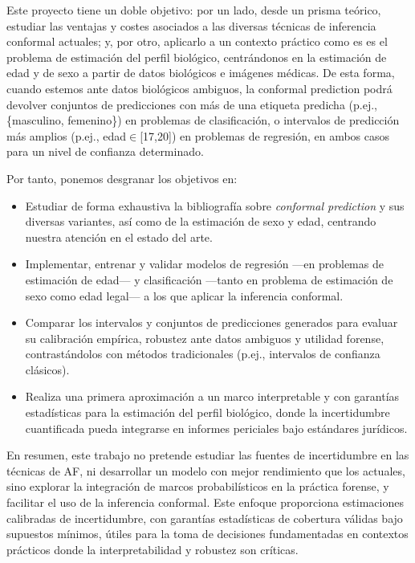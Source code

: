 
Este proyecto tiene un doble objetivo: por un lado, desde un prisma teórico, estudiar las ventajas y costes asociados a 
las diversas técnicas de inferencia conformal actuales; y, por otro, aplicarlo a un contexto práctico como es es el 
problema de estimación del perfil biológico, centrándonos en la estimación de edad y de sexo a partir de datos biológicos
e imágenes médicas. De esta forma, cuando estemos ante datos biológicos ambiguos, la conformal prediction podrá devolver 
conjuntos de predicciones con más de una etiqueta predicha (p.ej., \{masculino, femenino\}) en problemas de clasificación, 
o intervalos de predicción más amplios (p.ej., edad$\in$[17,20]) en problemas de regresión, en ambos casos para un 
nivel de confianza determinado.

Por tanto, ponemos desgranar los objetivos en:

\begin{itemize}

    \item Estudiar de forma exhaustiva la bibliografía sobre \textit{conformal prediction} y sus diversas variantes, así
          como de la estimación de sexo y edad, centrando nuestra atención en el estado del arte.

    \item Implementar, entrenar y validar modelos de regresión ---en problemas de estimación de edad--- y clasificación 
    ---tanto en problema de estimación de sexo como edad legal--- a los que aplicar la inferencia conformal.

    \item Comparar los intervalos y conjuntos de predicciones generados para evaluar su calibración empírica, robustez 
    ante datos ambiguos y utilidad forense, contrastándolos con métodos tradicionales (p.ej., intervalos de confianza 
    clásicos).  

    \item Realiza una primera aproximación a un marco interpretable y con garantías estadísticas para la estimación del 
    perfil biológico, donde la incertidumbre cuantificada pueda integrarse en informes periciales bajo estándares jurídicos.

\end{itemize}


En resumen, este trabajo no pretende estudiar las fuentes de incertidumbre en las técnicas de AF, ni desarrollar un 
modelo con mejor rendimiento que los actuales, sino explorar la integración de marcos probabilísticos en la práctica 
forense, y facilitar el uso de la inferencia conformal. 
Este enfoque proporciona estimaciones calibradas de incertidumbre, con garantías estadísticas de cobertura válidas 
bajo supuestos mínimos, útiles para la toma de decisiones fundamentadas en contextos prácticos 
donde la interpretabilidad y robustez son críticas.


